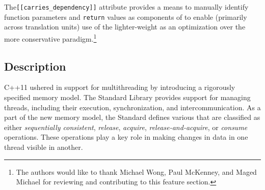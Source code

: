 

\label{the-carries_dependency-attribute}
\setcounter{table}{0}
\setcounter{footnote}{0}
\setcounter{lstlisting}{0}

The\lstinline![[carries_dependency]]! attribute provides a means to
manually identify function parameters and \lstinline!return! values as
components of  to enable (primarily
across translation units) use of the lighter-weight
  as an
optimization over the more conservative 
paradigm.{\cprotect\footnote{The authors would like to thank Michael
Wong, Paul McKenney, and Maged Michael for reviewing and contributing to this feature section.}}

\subsection[Description]{Description}\label{description}

C++11 ushered in support for multithreading by introducing a rigorously
specified memory model. The Standard Library provides support for
managing threads, including their execution, synchronization, and
intercommunication. As a part of the new memory model, the Standard
defines various  that are classified as either \emph{sequentially
consistent}, \emph{release}, \emph{acquire},
\emph{release-and-acquire}, or \emph{consume} operations. These
operations play a key role in making changes in data in one thread
visible in another.

